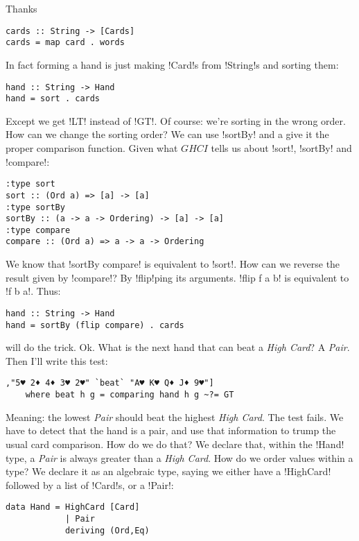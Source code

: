 \hspace*{\fill}
\lhA \error Thanks
\begin{lstlisting}[frame=single]
cards :: String -> [Cards]
cards = map card . words 
\end{lstlisting}
In fact forming a hand is just making \il!Card!s from \il!String!s and sorting them:
\begin{lstlisting}[frame=single]
hand :: String -> Hand
hand = sort . cards
\end{lstlisting}
\failure Except we get \il!LT! instead of \il!GT!.
\lhN Of course: we're sorting in the wrong order. How can we change the sorting order?
\lhA We can use \il!sortBy! and a give it the proper comparison function. 
\lhN Given what $GHCI$ tells us about \il!sort!, \il!sortBy! and \il!compare!:
\begin{small}
\begin{verbatim}
:type sort
sort :: (Ord a) => [a] -> [a]
:type sortBy
sortBy :: (a -> a -> Ordering) -> [a] -> [a]
:type compare
compare :: (Ord a) => a -> a -> Ordering
\end{verbatim}
\end{small}
We know that \il!sortBy compare! is equivalent to \il!sort!. 
How can we reverse the result given by \il!compare!?
\lhA By \il!flip!ping its arguments. \il!flip f a b! is equivalent to \il!f b a!. Thus:
\begin{lstlisting}[frame=single]
hand :: String -> Hand
hand = sortBy (flip compare) . cards
\end{lstlisting}
\success will do the trick.
\lhN Ok. What is the next hand that can beat a \emph{High Card}?
\lhA A \emph{Pair}.
\lhN Then I'll write this test:
\begin{lstlisting}[frame=single]
       ,"5♥ 2♦ 4♦ 3♥ 2♥" `beat` "A♥ K♥ Q♦ J♦ 9♥"]
    where beat h g = comparing hand h g ~?= GT
\end{lstlisting}
Meaning: the lowest \emph{Pair} should beat the highest \emph{High Card}.
\lhA \failure The test fails. We have to detect that the hand is a pair, and use that information to trump the usual card comparison.
\lhN How do we do that?
\lhA \failure We declare that, within the \il!Hand! type, a \emph{Pair} is always greater than a \emph{High Card}. 
\lhN How do we order values within a type?
\lhA \failure We declare it as an algebraic type, saying we either have a \il!HighCard! followed by a list of \il!Card!s, or a \il!Pair!:
\begin{lstlisting}[frame=single]
data Hand = HighCard [Card]
            | Pair
            deriving (Ord,Eq)
\end{lstlisting}
